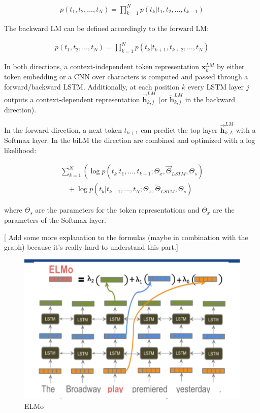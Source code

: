 \documentclass[]{krantz}
\begin{document}
\[
\begin{aligned}
p\left(t_{1}, t_{2}, \ldots, t_{N}\right)=\prod_{k=1}^{N} p\left(t_{k} | t_{1}, t_{2}, \ldots, t_{k-1}\right)
\end{aligned}
\]

The backward LM can be defined accordingly to the forward LM:

\[
\begin{aligned}
p\left(t_{1}, t_{2}, \ldots, t_{N}\right)=\prod_{k=1}^{N} p\left(t_{k} | t_{k+1}, t_{k+2}, \ldots, t_{N}\right)
\end{aligned}
\]

In both directions, a context-independent token representation \(\mathbf{x}_{k}^{L M}\) by either token embedding or a CNN over characters is computed and passed through a forward/backward LSTM. Additionally, at each position \(k\) every LSTM layer \(j\) outputs a context-dependent representation \(\overrightarrow{\mathbf{h}}_{k, j}^{L M}\) (or \(\overleftarrow{\mathbf{h}}_{k, j}^{L M}\) in the backward direction).

In the forward direction, a next token \(t_{k+1}\) can predict the top layer \(\overrightarrow{\mathbf{h}}_{k, L}^{L M}\) with a Softmax layer. In the biLM the direction are combined and optimized with a log likelihood:

\[\begin{array}{l}
\sum_{k=1}^{N}\left(\log p\left(t_{k} | t_{1}, \ldots, t_{k-1} ; \Theta_{x}, \vec{\Theta}_{L S T M}, \Theta_{s}\right)\right. \\
\quad+\log p\left(t_{k} | t_{k+1}, \ldots, t_{N} ; \Theta_{x}, \overleftarrow{\Theta}_{L S T M}, \Theta_{s}\right)
\end{array}\]

where \(\Theta_{s}\) are the parameters for the token representations and
\(\Theta_{x}\) are the parameters of the Softmax-layer.

{[} Add some more explanation to the formulas (maybe in combination with the graph) because it's really hard to understand this part.{]}

\begin{figure}

{\centering \includegraphics[width=0.9\linewidth]{figures/02-01-transfer-learning-for-nlp-1/elmo} 

}

\caption{ELMo}\label{fig:ch21-figure08}
\end{figure}
\end{document}
